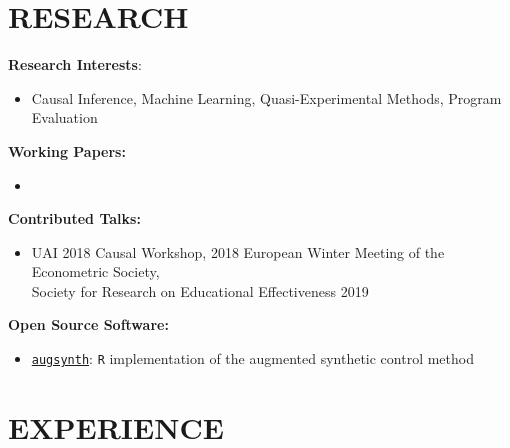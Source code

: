 \documentclass{res}
\begin{document}
\begin{resume}
\section{RESEARCH}
\textbf{Research Interests}:
\begin{itemize}
\item[] Causal Inference, Machine Learning, Quasi-Experimental Methods, Program Evaluation%
\end{itemize}%
\vspace{-4mm}
\textbf{Working Papers:}
\begin{itemize}
\item[] 
\end{itemize}
\vspace{-4mm}
\textbf{Contributed Talks:}
\begin{itemize}
\item[] UAI 2018 Causal Workshop, 2018 European Winter Meeting of the Econometric Society,
\\Society for Research on Educational Effectiveness 2019
\end{itemize}
\vspace{-4mm}
\textbf{Open Source Software:}
\begin{itemize}
\item[] \href{https://github.com/ebenmichael/augsynth}{\texttt{augsynth}}: \texttt{R} implementation of the augmented synthetic control method
\end{itemize}
\section{EXPERIENCE}


\end{resume}
\end{document}
